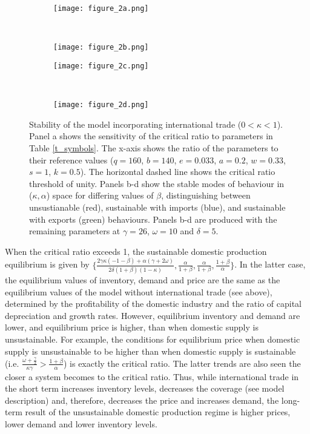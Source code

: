 \documentclass[12pt]{article}
\begin{document}
\begin{figure}[t!]
  \begin{subfigure}{0.5\textwidth}
      \texttt{[image: figure\_2a.png]}
  \end{subfigure}%
  ~%
  \begin{subfigure}{0.5\textwidth}
      \texttt{[image: figure\_2b.png]}
  \end{subfigure}

  \begin{subfigure}{0.5\textwidth}
      \texttt{[image: figure\_2c.png]}
  \end{subfigure}%
  ~%
  \begin{subfigure}{0.5\textwidth}
      \texttt{[image: figure\_2d.png]}
  \end{subfigure}%

  \caption{Stability of the model incorporating international trade ($0 < \kappa < 1$). Panel a shows the sensitivity of the critical ratio to parameters in Table \ref{t_symbols}. The x-axis shows the ratio of the parameters to their reference values ($q = 160$, $b = 140$, $e = 0.033$, $a = 0.2$, $w = 0.33$, $s=1$, $k=0.5$). The horizontal dashed line shows the critical ratio threshold of unity. Panels b-d show the stable modes of behaviour in ($\kappa, \alpha$) space for differing values of $\beta$, distinguishing between unsustianable (red), sustainable with imports (blue), and sustainable with exports (green) behaviours. Panels b-d are produced with the remaining parameters at $\gamma = 26$, $\omega = 10$ and $\delta = 5$.}
  \label{figure2}
\end{figure}

When the critical ratio exceeds 1, the sustainable domestic production equilibrium is given by $\{\frac{2 \gamma \kappa (- 1 - \beta) + \alpha (\gamma + 2 \omega)}{2 \delta (1+\beta)(1 - \kappa) }, \frac{\alpha}{1 + \beta}, \frac{\alpha}{1 + \beta}, \frac{1 + \beta}{\alpha}\}$. In the latter case, the equilibrium values of inventory, demand and price are the same as the equilibrium values of the model without international trade (see above), determined by the profitability of the domestic industry and the ratio of capital depreciation and growth rates. However, equilibrium inventory and demand are lower, and equilibrium price is higher, than when domestic supply is unsustainable. For example, the conditions for equilibrium price when domestic supply is unsustainable to be higher than when domestic supply is sustainable (i.e. $\frac{\omega + \frac{\gamma}{2}}{\kappa \gamma} > \frac{1 + \beta}{\alpha}$) is exactly the critical ratio. The latter trends are also seen the closer a system becomes to the critical ratio. Thus, while international trade in the short term increases inventory levels, decreases the coverage (see model description) and, therefore, decreases the price and increases demand, the long-term result of the unsustainable domestic production regime is higher prices, lower demand and lower inventory levels.
\end{document}
